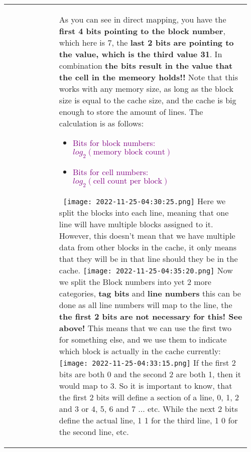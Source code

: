 \documentclass[main.tex,fontsize=8pt,paper=a4,paper=portrait,DIV=calc,]{scrartcl}
\begin{document}
\begin{table}[ht!]
\begin{tabular}{|m{0.2\linewidth}|m{0.755\linewidth}|}
\hline
&
As you can see in direct mapping, you have the \textbf{first 4 bits pointing to the block number}, which here is 7, the \textbf{last 2 bits are pointing to the value, which is the third value 31}.\newline
In combination \textbf{the bits result in the value that the cell in the memeory holds!!}\newline
Note that this works with any memory size, as long as the block size is equal to the cache size, and the cache is big enough to store the amount of lines.\newline
The calculation is as follows:\newline
\begin{itemize}
  \item \textcolor{purple}{Bits for block numbers: \(log_2(\text{memory block count})\)}
  \item \textcolor{purple}{Bits for cell numbers: \( log_2(\text{cell count per block}) \)}
\end{itemize} 
\, \newline
\texttt{[image: 2022-11-25-04:30:25.png]}\newline
Here we split the blocks into each line, meaning that one line will have multiple blocks assigned to it.\newline
However, this doesn't mean that we have multiple data from other blocks in the cache, it only means that they will be in that line should they be in the cache.\newline
\texttt{[image: 2022-11-25-04:35:20.png]}\newline
Now we split the Block numbers into yet 2 more categories, \textbf{tag bits} and \textbf{line numbers}\newline
this can be done as all line numbers will map to the line, the \textbf{the first 2 bits are not necessary for this! See above!}\newline
This means that we can use the first two for something else, and we use them to indicate which block is actually in the cache currently:\newline
\texttt{[image: 2022-11-25-04:33:15.png]}\newline
If the first 2 bits are both 0 and the second 2 are both 1, then it would map to 3.\newline
So it is important to know, that the first 2 bits will define a section of a line, 0, 1, 2 and 3 or 4, 5, 6 and 7 ... etc. While the next 2 bits define the actual line, 1 1 for the third line, 1 0 for the second line, etc.\\

\end{tabular}
\end{table}
\end{document}
